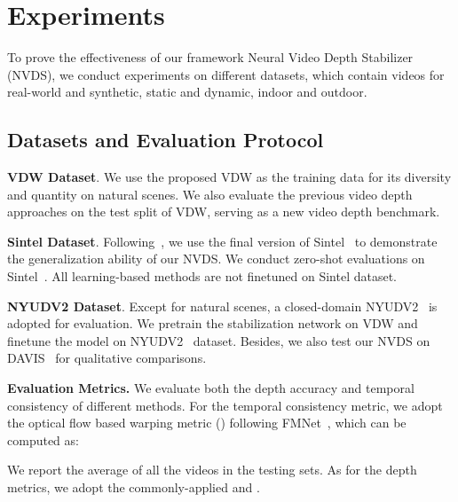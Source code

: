 \documentclass[10pt,twocolumn,letterpaper]{article}
\def\framework{Neural Video Depth Stabilizer}
\def\sx{NVDS}
\def\sbn{stabilization network}
\def\data{VDW}
\begin{document}
\section{Experiments}
To prove the effectiveness of our framework \framework{} (\sx{}), we conduct experiments on  different datasets, which contain videos for real-world and synthetic, static and dynamic, indoor and outdoor.
\subsection{Datasets and Evaluation Protocol}
\label{sec:dataset}
\noindent \textbf{\data{} Dataset}. We use the proposed \data{} as the training data for its diversity and quantity on natural scenes. We also evaluate the previous video depth approaches on the test split of \data{}, serving as a new video depth benchmark.

\noindent \textbf{Sintel Dataset}. Following~\cite{rcvd,dycvd}, we use the final version of Sintel~\cite{sintel} to demonstrate the generalization ability of our \sx{}. We conduct zero-shot evaluations on Sintel~\cite{sintel}. All learning-based methods are not finetuned on Sintel dataset.


\noindent \textbf{NYUDV2 Dataset}. Except for natural scenes, a closed-domain NYUDV2~\cite{nyu} is adopted for evaluation. We pretrain the \sbn{} on \data{} and finetune the model on NYUDV2~\cite{nyu} dataset. Besides, we also test our \sx{} on DAVIS~\cite{davis} for qualitative comparisons.









\noindent \textbf{Evaluation Metrics.}
We evaluate both the depth accuracy and temporal consistency of different methods. For the temporal consistency metric, we adopt the optical flow based warping metric () following FMNet~\cite{fmnet}, which can be computed as:

We report the average  of all the videos in the testing sets. As for the depth metrics, we adopt the commonly-applied  and .
 
\end{document}
